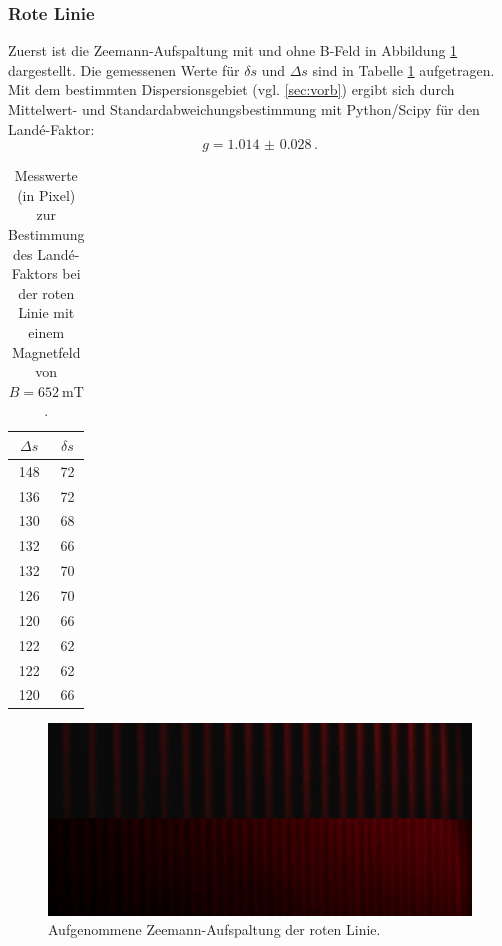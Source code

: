 \subsubsection{Rote Linie}
	Zuerst ist die Zeemann-Aufspaltung mit und ohne B-Feld in Abbildung \ref{fig:roterstern}
	dargestellt.
	Die gemessenen Werte für $\delta s$ und $\Delta s$ sind in Tabelle \ref{tab:rot}
	aufgetragen. Mit dem bestimmten Dispersionsgebiet (vgl. \ref{sec:vorb}) ergibt sich
	durch Mittelwert- und Standardabweichungsbestimmung mit Python/Scipy \cite{scipy} für
	den Landé-Faktor:
	\begin{equation*}
		g = \SI{1.014(28)} \, \text{.}
	\end{equation*}
	\begin{table}
		\centering
		\caption{Messwerte (in Pixel) zur Bestimmung des Landé-Faktors bei der roten Linie mit einem Magnetfeld von $B = \SI{652}{\milli\tesla}$.}
		\label{tab:rot}
		\begin{tabular}{c | c}
			\toprule
			$\Delta s$ & $\delta s$\\
			\midrule
			148 & 72 \\
			136 & 72 \\
			130 & 68 \\
			132 & 66 \\
			132 & 70 \\
			126 & 70 \\
			120 & 66 \\
			122 & 62 \\
			122 & 62 \\
			120 & 66 \\
			\bottomrule
		\end{tabular}
	\end{table}
\begin{figure}
	\centering
	\includegraphics[width=\textwidth]{ouurs/red_cropped.png}
	\caption{Aufgenommene Zeemann-Aufspaltung der roten Linie.}
	\label{fig:roterstern}
\end{figure}

